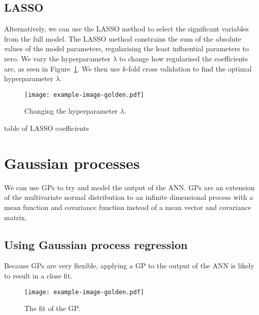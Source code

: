 \subsection{LASSO}

Alternatively, we can use the \ac{LASSO} method to select the significant variables from the full model.
The \ac{LASSO} method constrains the sum of the absolute values of the model parameters, regularising the least influential parameters to zero.
We vary the hyperparameter \(\lambda\) to change how regularised the coefficients are, as seen in Figure~\ref{fig:lasso-lambda}.
We then use \(k\)-fold cross validation to find the optimal hyperparameter \(\lambda\).

\begin{figure}[htbp]
	\centering
	\texttt{[image: example-image-golden.pdf]}
	\caption{Changing the hyperparameter \(\lambda\).}
	\label{fig:lasso-lambda}
\end{figure}

\begin{todo}
	table of LASSO coefficients
\end{todo}

\section{Gaussian processes}

We can use \acp{GP} to try and model the output of the \ac{ANN}.
\acp{GP} are an extension of the multivariate normal distribution to an infinite dimensional process with a mean function and covariance function instead of a mean vector and covariance matrix.

\subsection{Using Gaussian process regression}

Because \acp{GP} are very flexible, applying a GP to the output of the ANN is likely to result in a close fit.

\begin{figure}[htbp]
	\centering
	\texttt{[image: example-image-golden.pdf]}
	\caption{The fit of the \ac{GP}.}
	\label{fig:gp-fit}
\end{figure}
